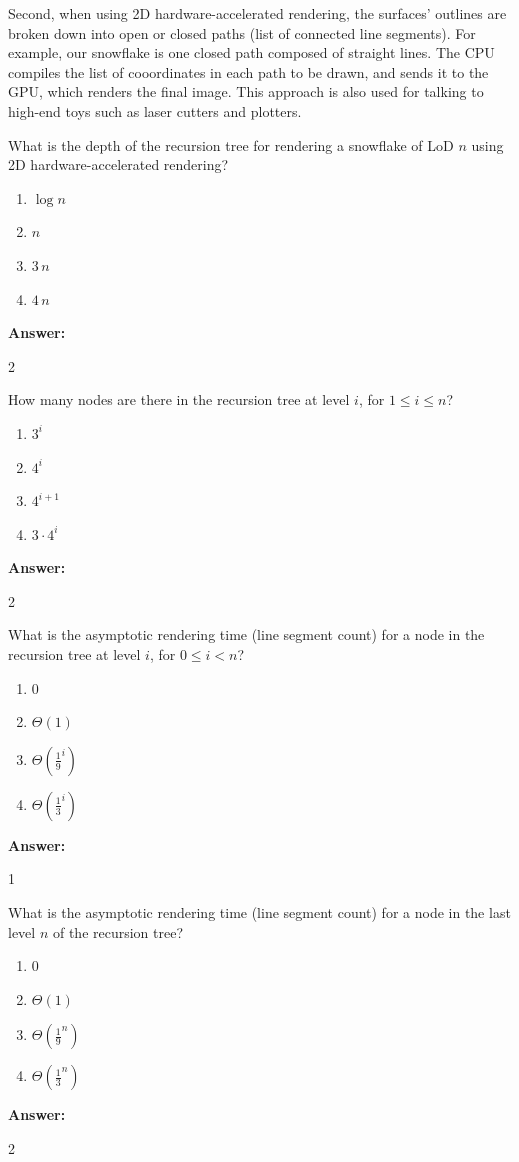 \documentclass[12pt,twoside]{article}
\newcommand{\answer}{
 \par\medskip
 \textbf{Answer:}
}
\newcommand{\answerIf}{ \answer
2
}
\newcommand{\answerIg}{ \answer
2
}
\newcommand{\answerIh}{ \answer
1
}
\newcommand{\answerIi}{ \answer
2
}
\begin{document}
\begin{problems}
Second, when using 2D hardware-accelerated rendering, the surfaces'
outlines are broken down into open or closed paths (list of connected
line segments). For example, our snowflake is one closed path composed of
straight lines. The CPU compiles the list of cooordinates in each path to be
drawn, and sends it to the GPU, which renders the final image. This approach is
also used for talking to high-end toys such as laser cutters and plotters.

\begin{problemparts}
  \problempart {} What is the depth of the recursion tree for rendering a
  snowflake of LoD $n$ using 2D hardware-accelerated rendering?
    \begin{enumerate}
      \item $\log n$
      \item $n$
      \item $3 \, n$
      \item $4 \, n$
    \end{enumerate}
\answerIf

  \problempart {} How many nodes are there in the recursion tree at level
  $i$, for $1 \le i \le n$?
    \begin{enumerate}
      \item $3 ^ i$
      \item $4 ^ i$
      \item $4 ^ {i + 1}$
      \item $3 \cdot 4 ^ i$
    \end{enumerate}
\answerIg

  \problempart {} What is the asymptotic rendering time (line segment count)
  for a node in the recursion tree at level $i$, for $0 \le i < n$?
    \begin{enumerate}
      \item $0$
      \item $\Theta(1)$
      \item $\Theta(\frac{1}{9}^i)$
      \item $\Theta(\frac{1}{3}^i)$
    \end{enumerate}
\answerIh

  \problempart {} What is the asymptotic rendering time (line segment count)
  for a node in the last level $n$ of the recursion tree?
    \begin{enumerate}
      \item $0$
      \item $\Theta(1)$
      \item $\Theta(\frac{1}{9}^n)$
      \item $\Theta(\frac{1}{3}^n)$
    \end{enumerate}
\answerIi


\end{problemparts}
\end{problems}
\end{document}
